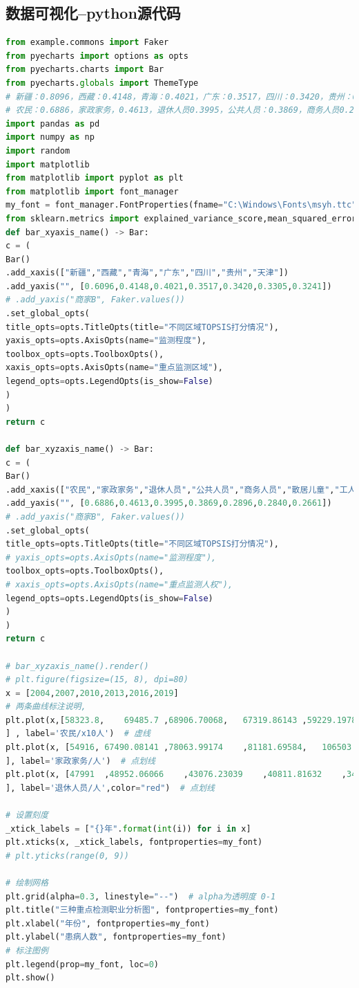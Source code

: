 \documentclass{whutmod}
\begin{document}
\subsection{数据可视化--python源代码}
\begin{lstlisting}[language=python]
from example.commons import Faker
from pyecharts import options as opts
from pyecharts.charts import Bar
from pyecharts.globals import ThemeType
# 新疆：0.8096，西藏：0.4148，青海：0.4021，广东：0.3517，四川：0.3420，贵州：0.3305.。。。。。。。。。陕西：0.2194
# 农民：0.6886，家政家务，0.4613，退休人员0.3995，公共人员：0.3869，商务人员0.2896，散居儿童：0.2840，工人：0.2661
import pandas as pd
import numpy as np
import random
import matplotlib
from matplotlib import pyplot as plt
from matplotlib import font_manager
my_font = font_manager.FontProperties(fname="C:\Windows\Fonts\msyh.ttc")#微软雅黑字体位置
from sklearn.metrics import explained_variance_score,mean_squared_error
def bar_xyaxis_name() -> Bar:
c = (
Bar()
.add_xaxis(["新疆","西藏","青海","广东","四川","贵州","天津"])
.add_yaxis("", [0.6096,0.4148,0.4021,0.3517,0.3420,0.3305,0.3241])
# .add_yaxis("商家B", Faker.values())
.set_global_opts(
title_opts=opts.TitleOpts(title="不同区域TOPSIS打分情况"),
yaxis_opts=opts.AxisOpts(name="监测程度"),
toolbox_opts=opts.ToolboxOpts(),
xaxis_opts=opts.AxisOpts(name="重点监测区域"),
legend_opts=opts.LegendOpts(is_show=False)
)
)
return c

def bar_xyzaxis_name() -> Bar:
c = (
Bar()
.add_xaxis(["农民","家政家务","退休人员","公共人员","商务人员","散居儿童","工人"])
.add_yaxis("", [0.6886,0.4613,0.3995,0.3869,0.2896,0.2840,0.2661])
# .add_yaxis("商家B", Faker.values())
.set_global_opts(
title_opts=opts.TitleOpts(title="不同区域TOPSIS打分情况"),
# yaxis_opts=opts.AxisOpts(name="监测程度"),
toolbox_opts=opts.ToolboxOpts(),
# xaxis_opts=opts.AxisOpts(name="重点监测人权"),
legend_opts=opts.LegendOpts(is_show=False)
)
)
return c

# bar_xyzaxis_name().render()
# plt.figure(figsize=(15, 8), dpi=80)
x = [2004,2007,2010,2013,2016,2019]
# 两条曲线标注说明,
plt.plot(x,[58323.8,	69485.7	,68906.70068,	67319.86143	,59229.19782,	57590.64375
] , label='农民/x10人')  # 虚线
plt.plot(x, [54916,	67490.08141	,78063.99174	,81181.69584,	106503.6705,	110400.3167
], label='家政家务/人')  # 点划线
plt.plot(x, [47991	,48952.06066	,43076.23039	,40811.81632	,34969.5661,	33507.68682
], label='退休人员/人',color="red")  # 点划线

# 设置刻度
_xtick_labels = ["{}年".format(int(i)) for i in x]
plt.xticks(x, _xtick_labels, fontproperties=my_font)
# plt.yticks(range(0, 9))

# 绘制网格
plt.grid(alpha=0.3, linestyle="--")  # alpha为透明度 0-1
plt.title("三种重点检测职业分析图", fontproperties=my_font)
plt.xlabel("年份", fontproperties=my_font)
plt.ylabel("患病人数", fontproperties=my_font)
# 标注图例
plt.legend(prop=my_font, loc=0)
plt.show()
\end{lstlisting}
\end{document}
